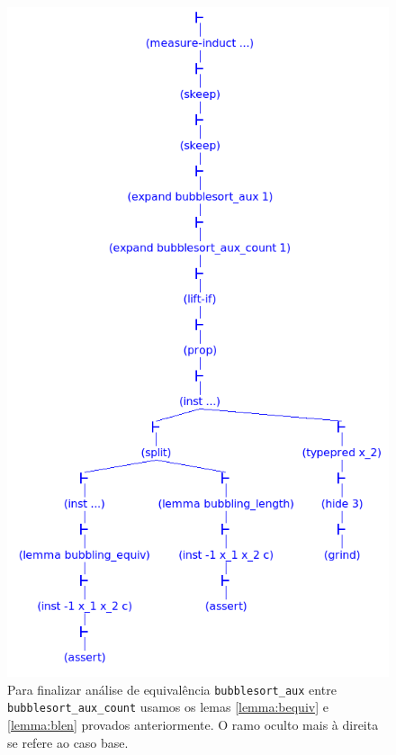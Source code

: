 \begin{figure}[H]
    \centering
    \includegraphics[width=0.75\linewidth,trim={0 0 3.5cm 14cm},clip]{figures/bubblesort-aux-equiv.png}
    \caption{Para finalizar análise de equivalência
    \texttt{bubblesort\_aux} entre \texttt{bubblesort\_aux\_count}
    usamos os lemas \ref{lemma:bequiv} e \ref{lemma:blen}
    provados anteriormente. O ramo oculto mais à direita se
    refere ao caso base.}
    \label{fig:bubaux2}
\end{figure}


